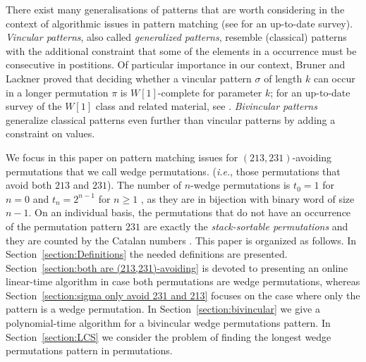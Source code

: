 \documentclass[a4paper]{llncs}
\newcounter{num}
\begin{document}
There exist many generalisations of patterns that are worth considering
in the context of algorithmic issues in pattern matching
(see \cite{Kitaev:book:2011} for an up-to-date survey).
\emph{Vincular patterns}, also called
\emph{generalized patterns},
resemble (classical) patterns with the additional constraint that some of the elements in
a occurrence must be consecutive in postitions.
Of particular importance in our context,
Bruner and Lackner \cite{DBLP:journals/corr/abs-1204-5224}
proved that deciding whether a vincular pattern
$\sigma$ of length $k$ can occur in a longer permutation
$\pi$ is $W[1]$-complete for
parameter $k$;
for an up-to-date survey of the $W[1]$ class and related material, see
\cite{Downey:Fellows:2013}.
\emph{Bivincular patterns} generalize classical patterns even further
than vincular
patterns by adding a constraint on values.

We focus in this paper on pattern matching issues for
$(213,231)$-avoiding permutations that we call wedge permutations.
(\emph{i.e.}, those permutations that avoid both $213$ and $231$).
The number of $n$-wedge permutations is
$t_0 = 1$ for $n = 0$ and
$t_n =2^{n-1}$ for $n\geq 1$ \cite{Simion:Schmidt:EJC:1985},
as they are in bijection with binary word of size $n-1$.
On an individual basis,
the permutations that do not have an occurrence of the permutation pattern $231$
are exactly the \emph{stack-sortable permutations} and they are counted by
the Catalan numbers \cite{Knuth:1997:ACP:260999}.
This paper is organized as follows.
In Section~\ref{section:Definitions} the needed definitions are presented.
Section~\ref{section:both are (213,231)-avoiding} is devoted to presenting
an online linear-time algorithm in case both 
permutations are wedge permutations,
whereas Section~\ref{section:sigma only avoid 231 and 213} focuses on the case
where only the pattern is a wedge permutation.
In Section~\ref{section:bivincular} we give a polynomial-time algorithm
for a bivincular wedge permutations pattern.
In Section~\ref{section:LCS} we consider the problem of finding the longest
wedge permutations pattern in permutations.
\end{document}
